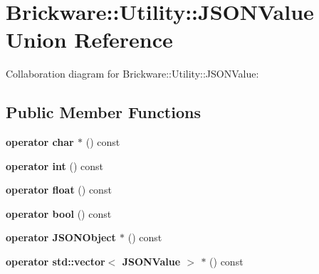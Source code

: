 \hypertarget{unionBrickware_1_1Utility_1_1JSONValue}{}\section{Brickware\+:\+:Utility\+:\+:J\+S\+O\+N\+Value Union Reference}
\label{unionBrickware_1_1Utility_1_1JSONValue}


Collaboration diagram for Brickware\+:\+:Utility\+:\+:J\+S\+O\+N\+Value\+:
\subsection*{Public Member Functions}
\begin{DoxyCompactItemize}
\item 
\hypertarget{unionBrickware_1_1Utility_1_1JSONValue_a4130c13420cbff255504ce43237e68ef}{}{\bfseries operator char $\ast$} () const \label{unionBrickware_1_1Utility_1_1JSONValue_a4130c13420cbff255504ce43237e68ef}

\item 
\hypertarget{unionBrickware_1_1Utility_1_1JSONValue_a63c9a73c929ae42cbaa2397f50dbaee2}{}{\bfseries operator int} () const \label{unionBrickware_1_1Utility_1_1JSONValue_a63c9a73c929ae42cbaa2397f50dbaee2}

\item 
\hypertarget{unionBrickware_1_1Utility_1_1JSONValue_aa091649344890b6943f7dc5de551cdcf}{}{\bfseries operator float} () const \label{unionBrickware_1_1Utility_1_1JSONValue_aa091649344890b6943f7dc5de551cdcf}

\item 
\hypertarget{unionBrickware_1_1Utility_1_1JSONValue_a4347ffd1d2d3da5a2a7cb5d7f9e6dd66}{}{\bfseries operator bool} () const \label{unionBrickware_1_1Utility_1_1JSONValue_a4347ffd1d2d3da5a2a7cb5d7f9e6dd66}

\item 
\hypertarget{unionBrickware_1_1Utility_1_1JSONValue_a49470318b3d31620d53376faa6203c46}{}{\bfseries operator J\+S\+O\+N\+Object $\ast$} () const \label{unionBrickware_1_1Utility_1_1JSONValue_a49470318b3d31620d53376faa6203c46}

\item 
\hypertarget{unionBrickware_1_1Utility_1_1JSONValue_a088d772fc704f70d3abe178b3c56f365}{}{\bfseries operator std\+::vector$<$ J\+S\+O\+N\+Value $>$ $\ast$} () const \label{unionBrickware_1_1Utility_1_1JSONValue_a088d772fc704f70d3abe178b3c56f365}


\end{DoxyCompactItemize}
